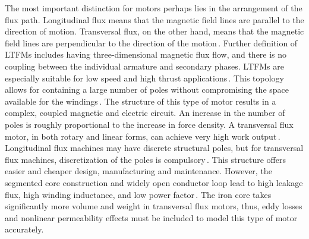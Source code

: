         
        The most important distinction for motors perhaps lies in the arrangement of the flux path. Longitudinal flux means that the magnetic field lines are parallel to the direction of motion. Transversal flux, on the other hand, means that the magnetic field lines are perpendicular to the direction of the motion\,\cite{Laithwaite1975LinearView}. Further definition of \acfp{LTFM} includes having three-dimensional magnetic flux flow, and there is no coupling between the individual armature and secondary phases. \acsp{LTFM} are especially suitable for low speed and high thrust applications\,\cite{Zhao2015,Shin2015}. This topology allows for containing a large number of poles without compromising the space available for the windings\,\cite{Laithwaite1971}. The structure of this type of motor results in a complex, coupled magnetic and electric circuit. An increase in the number of poles is roughly proportional to the increase in force density. A transversal flux motor, in both rotary and linear forms, can achieve very high work output\,\cite{Ueda2014SmallCondition,Hsu2011DevelopmentMotor,Wang2016OptimalApplications,Arshad2001,Siatkowski2008}. Longitudinal flux machines may have discrete structural poles, but for transversal flux machines, discretization of the poles is compulsory\,\cite{Baoming2009DesignMotor}. This structure offers easier and cheaper design, manufacturing and maintenance. However, the segmented core construction and widely open conductor loop lead to high leakage flux, high winding inductance, and low power factor\,\cite{Harris1997ComparisonMachines,Lu2003ModelingMachine}. The iron core takes significantly more volume and weight in transversal flux motors, thus, eddy losses and nonlinear permeability effects must be included to model this type of motor accurately.
        
